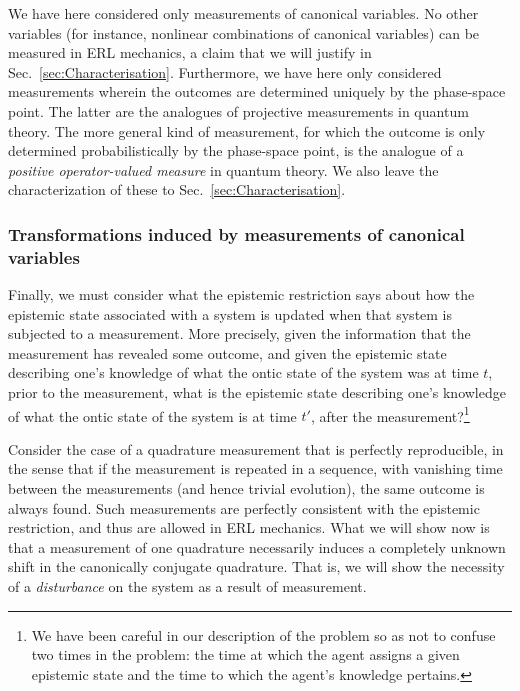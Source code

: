 \documentclass[pra,superscriptaddress,nofootinbib,12pt]{revtex4-2}
\begin{document}

We have here considered only measurements of canonical variables. No other variables (for instance, nonlinear combinations of canonical variables) can be measured in ERL mechanics, a claim that we will justify in Sec.~\ref{sec:Characterisation}.  Furthermore, we have here only considered measurements wherein the outcomes are determined uniquely by the phase-space point.  The latter are the analogues of projective measurements in quantum theory.  The more general kind of measurement, for which the outcome is only determined probabilistically by the phase-space point, is the analogue of a \emph{positive operator-valued measure} in quantum theory.  We also leave the characterization of these to Sec.~\ref{sec:Characterisation}.


\subsubsection{Transformations induced by measurements of canonical variables}

Finally, we must consider what the epistemic restriction says about how the epistemic state associated with a system is updated when that system is subjected to a measurement.  More precisely, given the information that the measurement has revealed some outcome, and given the epistemic state describing one's knowledge of what the ontic state of the system was at time $t$, prior to the measurement, what is the epistemic state describing one's knowledge of what the ontic state of the system is at time $t'$, after the measurement?\footnote{We have been careful in our description of the problem so as not to confuse two times in the problem: the time at which the agent assigns a given epistemic state and the time to which the agent's knowledge pertains.}

Consider the case of a quadrature measurement that is perfectly reproducible, in the sense that if the measurement is repeated in a sequence, with vanishing time between the measurements (and hence trivial evolution), the same outcome is always found.  Such measurements are perfectly consistent with the epistemic restriction, and thus are allowed in ERL mechanics.  What we will show now is that a measurement of one quadrature necessarily induces a completely unknown shift in the canonically conjugate quadrature.  That is, we will show the necessity of a \emph{disturbance} on the system as a result of measurement.
\end{document}
